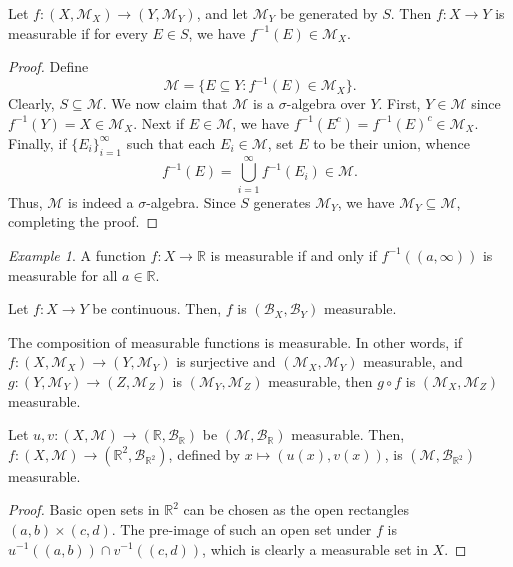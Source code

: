 \documentclass[11pt]{article}
\newcommand{\R}{\mathbb{R}}
\newcommand{\M}{\mathcal{M}}
\theoremstyle{definition}
\theoremstyle{remark}
\newtheorem*{example}{Example}
\numberwithin{equation}{section}
\begin{document}
    \begin{lemma}
        Let $f\colon (X, \M_X) \to (Y, \M_Y)$, and let $\M_Y$ be generated by $S$.
        Then $f\colon X\to Y$ is measurable if for every $E \in S$, we have
        $f^{-1}(E) \in \M_X$.
    \end{lemma}
    \begin{proof}
        Define \[
            \M = \{E \subseteq Y: f^{-1}(E) \in \M_X\}.
        \] Clearly, $S \subseteq \M$. We now claim that $\M$ is a $\sigma$-algebra
        over $Y$. First, $Y \in \M$ since $f^{-1}(Y) = X \in \M_X$. Next if $E \in
        \M$, we have $f^{-1}(E^c) = f^{-1}(E)^c \in \M_X$. Finally, if $\{E_i\}_{i =
        1}^\infty$ such that each $E_i \in \M$, set $E$ to be their union, whence \[
            f^{-1}(E) = \bigcup_{i = 1}^\infty f^{-1}(E_i) \in \M.
        \] Thus, $\M$ is indeed a $\sigma$-algebra. Since $S$ generates $\M_Y$, we
        have $\M_Y \subseteq \M$, completing the proof.
    \end{proof}
    \begin{example}
        A function $f\colon X \to \R$ is measurable if and only if $f^{-1}((a,
        \infty))$ is measurable for all $a \in \R$.
    \end{example}


    \begin{theorem}
        Let $f\colon X \to Y$ be continuous. Then, $f$ is $(\mathcal{B}_X,
        \mathcal{B}_Y)$ measurable.
    \end{theorem}

    \begin{lemma}
        The composition of measurable functions is measurable. In other words, if
        $f\colon (X, \M_X) \to (Y, \M_Y)$ is surjective and $(\M_X, \M_Y)$
        measurable, and $g\colon (Y, \M_Y) \to (Z, \M_Z)$ is $(\M_Y, \M_Z)$
        measurable, then $g\circ f$ is $(\M_X, \M_Z)$ measurable.
    \end{lemma}

    \begin{lemma}
        Let $u, v\colon (X, \M) \to (\R, \mathcal{B}_\R)$ be $(\M, \mathcal{B}_\R)$
        measurable. Then, $f\colon (X, \M) \to (\R^2, \mathcal{B}_{\R^2})$, defined
        by $x \mapsto (u(x), v(x))$, is $(\M, \mathcal{B}_{\R^2})$ measurable.
    \end{lemma}
    \begin{proof}
        Basic open sets in $\R^2$ can be chosen as the open rectangles $(a, b) \times
        (c, d)$. The pre-image of such an open set under $f$ is $u^{-1}((a, b)) \cap
        v^{-1}((c, d))$, which is clearly a measurable set in $X$.
    \end{proof}
    
\end{document}
